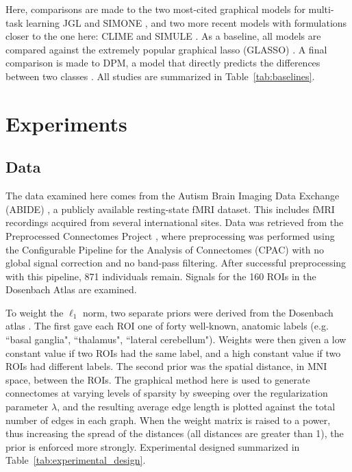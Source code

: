 \documentclass{article}
\begin{document}
Here, comparisons are made to the two most-cited graphical models for multi-task learning JGL \cite{danaher2014joint} and SIMONE \cite{chiquet2011inferring}, and two more recent models with formulations closer to the one here: CLIME \cite{cai2011constrained} and SIMULE \cite{wang2016constrained}. As a baseline, all models are compared against the extremely popular graphical lasso (GLASSO) \cite{friedman2008sparse}. A final comparison is made to DPM, a model that directly predicts the differences between two classes \cite{zhao2014direct}. All studies are summarized in Table~\ref{tab:baselines}.
\section{Experiments}
\label{experiments}
\subsection{Data}
The data examined here comes from the Autism Brain Imaging Data Exchange (ABIDE) \cite{di2014autism}, a publicly available resting-state fMRI dataset. This includes fMRI recordings acquired from several international sites. Data was retrieved from the Preprocessed Connectomes Project \cite{craddock2014preprocessed}, where preprocessing was performed using the Configurable Pipeline for the Analysis of Connectomes (CPAC) \cite{craddock2013towards} with no global signal correction and no band-pass filtering. After successful preprocessing with this pipeline, 871 individuals remain. Signals for the 160 ROIs in the Dosenbach Atlas \cite{dosenbach2010prediction} are examined.

To weight the $\ell_1$ norm, two separate priors were derived from the Dosenbach atlas \cite{dosenbach2010prediction}. The first gave each ROI one of forty well-known, anatomic labels (e.g. ``basal ganglia", ``thalamus", ``lateral cerebellum"). Weights were then given a low constant value if two ROIs had the same label, and a high constant value if two ROIs had different labels. The second prior was the spatial distance, in MNI space, between the ROIs. The graphical method here is used to generate connectomes at varying levels of sparsity by sweeping over the regularization parameter $\lambda$, and the resulting average edge length is plotted against the total number of edges in each graph. When the weight matrix is raised to a power, thus increasing the spread of the distances (all distances are greater than 1), the prior is enforced more strongly. Experimental designed summarized in Table~\ref{tab:experimental_design}.
\end{document}
